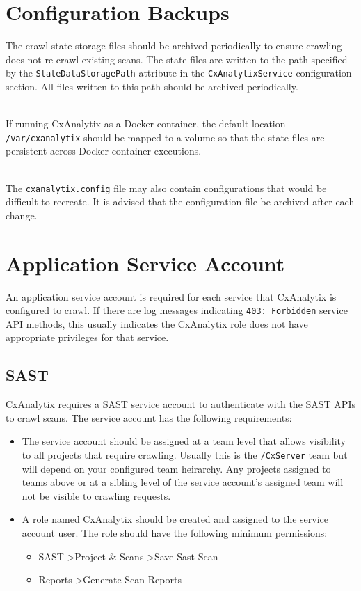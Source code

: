 \section{Configuration Backups}
The crawl state storage files should be archived periodically to ensure crawling does not re-crawl existing scans. The state files are written to the path 
specified by the \verb|StateDataStoragePath| attribute in the \verb|CxAnalytixService| configuration section.  All files written to this path should
be archived periodically.

\noindent\\If running CxAnalytix as a Docker container, the default location \verb|/var/cxanalytix| should be mapped to a volume so that the state files are persistent across 
Docker container executions.  

\noindent\\The \verb|cxanalytix.config| file may also contain configurations that would be difficult to recreate.  It is advised that the configuration file be archived
after each change.

\section{Application Service Account}

An application service account is required for each service that CxAnalytix is configured to crawl.  If there are log messages indicating 
\verb|403: Forbidden| service API methods, this usually indicates the CxAnalytix role does not have appropriate privileges for that service.


\subsection{SAST}
CxAnalytix requires a SAST service account to authenticate with the SAST APIs to crawl scans. The service account has the following requirements:

\begin{itemize}
    \item The service account should be assigned at a team level that allows visibility to all projects that require crawling. 
    Usually this is the \verb|/CxServer|
    team but will depend on your configured team heirarchy. Any projects assigned to teams above or at a sibling level of the service account's assigned team 
    will not be visible to crawling requests.

    \item A role named CxAnalytix should be created and assigned to the service account user. The role should have the following minimum permissions:
    \begin{itemize}
        \item SAST->Project \& Scans->Save Sast Scan
        \item Reports->Generate Scan Reports
    \end{itemize}

\end{itemize}

